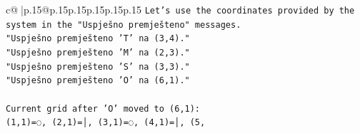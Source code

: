 \documentclass{article}
\begin{document}
{\begin{supertabular}{c@{$\;$}|p{.15\linewidth}@{}p{.15\linewidth}p{.15\linewidth}p{.15\linewidth}p{.15\linewidth}p{.15\linewidth}}
{{{\texttt{Let's use the coordinates provided by the system in the "Uspješno premješteno" messages.} \\
\texttt{"Uspješno premješteno 'T' na (3,4)."} \\
\texttt{"Uspješno premješteno 'M' na (2,3)."} \\
\texttt{"Uspješno premješteno 'S' na (3,3)."} \\
\texttt{"Uspješno premješteno 'O' na (6,1)."} \\
\\ 
\texttt{Current grid after 'O' moved to (6,1):} \\
\texttt{(1,1)=◌, (2,1)=│, (3,1)=◌, (4,1)=│, (5,} \\
            }
        }
    }
     \\ \\


\end{supertabular}}
\end{document}
